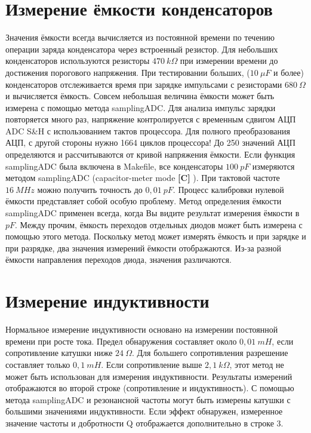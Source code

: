 \section{Измерение ёмкости конденсаторов}
Значения ёмкости всегда вычисляется из постоянной времени по течению операции заряда конденсатора через встроенный
резистор. Для небольших конденсаторов используются резисторы \(470~k\Omega\) при измерении времени до достижения
порогового напряжения. При тестировании больших, (\(10~\mu F\) и более) конденсаторов отслеживается время при зарядке
импульсами с резисторами \(680~\Omega\) и вычисляется ёмкость.
Совсем небольшая величина ёмкости может быть измерена с помощью метода samplingADC.
Для анализа импульс зарядки повторяется много раз, напряжение контролируется с временным сдвигом АЦП ADC S\&H 
с использованием тактов процессора. Для полного преобразования АЦП, с другой стороны нужно 1664 циклов 
процессора! До 250 значений АЦП определяются и рассчитываются от кривой напряжения 
ёмкости. Если функция samplingADC была включена в Makefile, все конденсаторы \(100~pF\) 
измеряются методом samplingADC (capacitor-meter mode \textbf{[C]} ). При тактовой частоте \(16~MHz\) 
можно получить точность до \(0,01~pF\). Процесс калибровки нулевой ёмкости представляет 
собой особую проблему. Метод определения ёмкости samplingADC применен всегда, когда Вы 
видите результат измерения ёмкости в \(pF\). Между прочим, ёмкость переходов отдельных 
диодов может быть измерена с помощью этого метода. Поскольку метод может измерять 
ёмкость и при зарядке и при разрядке, два значения измерений ёмкости отображаются. Из-за 
разной ёмкости направления переходов диода, значения различаются. 

\section{Измерение индуктивности}
Нормальное измерение индуктивности основано на измерении постоянной времени при росте тока.
Предел обнаружения составляет около \(0,01~mH\), если сопротивление катушки ниже \(24~\Omega\).
Для большего сопротивления разрешение составляет только \(0,1~mH\).
Если сопротивление выше \(2,1~k\Omega\), этот метод не может быть использован для измерения индуктивности.
Результаты измерений отображаются во второй строке (сопротивление и индуктивность).
С помощью метода samplingADC и резонансной частоты могут быть измерены катушки с большими значениями индуктивности.
Если эффект обнаружен, измеренное значение частоты и добротности Q отображается дополнительно в строке 3.

